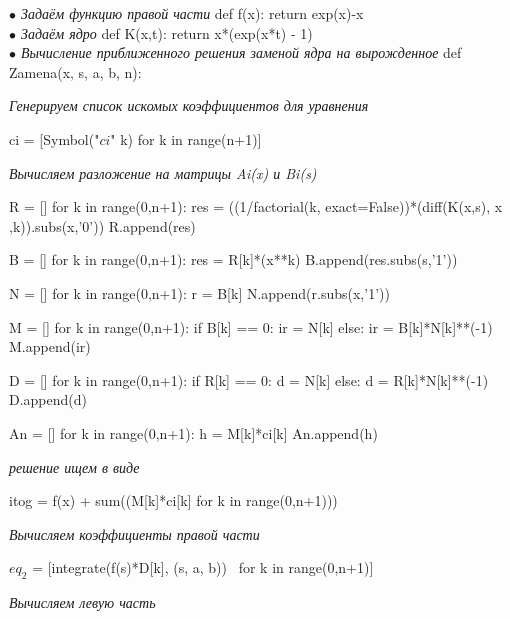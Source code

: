 \documentclass[12pt]{article}
\begin{document}
\textit{$ \bullet $                                          Задаём функцию правой части} \vskip 0.3cm
def f(x): \vskip 0.3cm
return exp(x)-x\\

\textit{$ \bullet $                                                 Задаём ядро} \vskip 0.3cm
def K(x,t): \vskip 0.3cm
return x*(exp(x*t) - 1)\\

\textit{$ \bullet $                          Вычисление приближенного решения заменой ядра на вырожденное} \vskip 0.3cm
def Zamena(x, s, a, b, n): \vskip 0.3cm

\textit{Генерируем список искомых коэффициентов для уравнения} \vskip 0.3cm

ci = [Symbol("$ ci $"  k) for k in range(n+1)] \vskip 0.3cm

\textit{ Вычисляем разложение на матрицы Ai(x) и Bi(s)} \vskip 0.3cm

R = [] \vskip 0.3cm
for k in range(0,n+1): \vskip 0.3cm 
res  = ((1/factorial(k, exact=False))*(diff(K(x,s), x ,k)).subs(x,'0')) \vskip 0.3cm
R.append(res) \vskip 0.3cm

B = [] \vskip 0.3cm
for k in range(0,n+1): \vskip 0.3cm
res  = R[k]*(x**k) \vskip 0.3cm 
B.append(res.subs(s,'1')) \vskip 0.3cm

N = [] \vskip 0.3cm
for k in range(0,n+1): \vskip 0.3cm
r  = B[k] \vskip 0.3cm
N.append(r.subs(x,'1')) \vskip 0.3cm

M = [] \vskip 0.3cm
for k in range(0,n+1): \vskip 0.3cm
if B[k] == 0: \vskip 0.3cm
ir = N[k] \vskip 0.3cm
else: \vskip 0.3cm
ir  = B[k]*N[k]**(-1) \vskip 0.3cm
M.append(ir) \vskip 0.3cm

D = [] \vskip 0.3cm 
for k in range(0,n+1): \vskip 0.3cm
if R[k] == 0: \vskip 0.3cm
d = N[k] \vskip 0.3cm
else: \vskip 0.3cm 
d  = R[k]*N[k]**(-1) \vskip 0.3cm
D.append(d) \vskip 0.3cm

An = [] \vskip 0.3cm
for k in range(0,n+1): \vskip 0.3cm
h  = M[k]*ci[k] \vskip 0.3cm
An.append(h) \vskip 0.3cm

\textit{решение ищем в виде} \vskip 0.3cm

itog = f(x) + sum((M[k]*ci[k] for k in range(0,n+1))) \vskip 0.3cm

\textit{Вычисляем коэффициенты правой части}

$ eq_2 $ = [integrate(f(s)*D[k], (s, a, b)) \
for k in range(0,n+1)] \vskip 0.3cm

\textit{Вычисляем левую часть} \vskip 0.3cm
\end{document}
